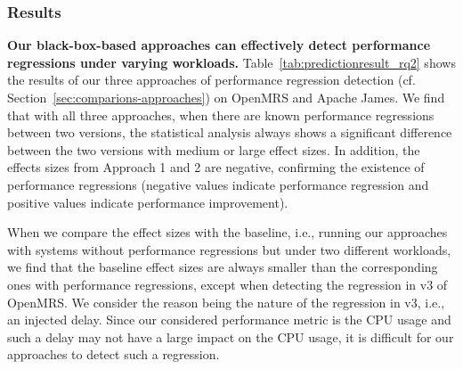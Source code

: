 \subsubsection*{Results}

\noindent\textbf{Our black-box-based approaches can effectively detect performance regressions under varying workloads.}
Table~\ref{tab:predictionresult_rq2} shows the results of our three approaches of performance regression detection (cf. Section~\ref{sec:comparions-approaches}) on OpenMRS and Apache James. We find that with all three approaches, when there are known performance regressions between two versions, the statistical analysis always shows a significant difference between the two versions with medium or large effect sizes. In addition, the effects sizes from Approach 1 and 2 are negative, confirming the existence of performance regressions (negative values indicate performance regression and positive values indicate performance improvement). 

When we compare the effect sizes with the baseline, i.e., running our approaches with systems without performance regressions but under two different workloads, we find that the baseline effect sizes are always smaller than the corresponding ones with performance regressions, except when detecting the regression in v3 of OpenMRS. We consider the reason being the nature of the regression in v3, i.e., an injected delay. Since our considered performance metric is the CPU usage and such a delay may not have a large impact on the CPU usage, it is difficult for our approaches to detect such a regression. 


